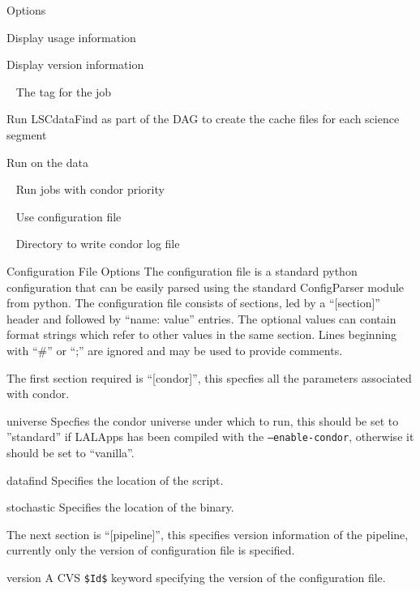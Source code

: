 \begin{entry}
\item[Options]\leavevmode
\begin{entry}
\item[\option{--help}] Display usage information
\item[\option{--version}] Display version information
\item[\option{--user-tag}~\parm{TAG}] The tag for the job
\item[\option{--datafind}] Run LSCdataFind as part of the DAG to create
the cache files for each science segment
\item[\option{--stochastic}] Run  on the data
\item[\option{--priority}~\parm{PRIO}] Run jobs with condor priority 
\item[\option{--config-file}~\parm{FILE}] Use configuration file 
\item[\option{--log-path}~\parm{PATH}] Directory to write condor log file
\end{entry}

\item[Configuration File Options]
The configuration file is a standard python configuration that can be
easily parsed using the standard ConfigParser module from python. The
configuration file consists of sections, led by a ``[section]'' header
and followed by ``name: value'' entries. The optional values can contain
format strings which refer to other values in the same section. Lines
beginning with ``\#'' or ``;'' are ignored and may be used to provide
comments.

The first section required is ``[condor]'', this specfies all the
parameters associated with condor.
\begin{entry}
\item[universe]
Specfies the condor universe under which to run, this should be set to
''standard'' if LALApps has been compiled with the
\texttt{--enable-condor}, otherwise it should be set to ``vanilla''.
\item[datafind]
Specifies the location of the  script.
\item[stochastic]
Specifies the location of the  binary.
\end{entry}

The next section is ``[pipeline]'', this specifies version information
of the pipeline, currently only the version of configuration file is
specified.
\begin{entry}
\item[version]
A CVS \texttt{\$Id\$} keyword specifying the version of the
configuration file.
\end{entry}


\end{entry}
